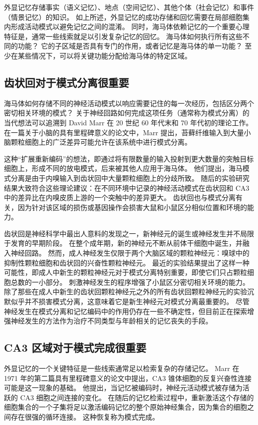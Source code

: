 外显记忆存储事实（语义记忆）、地点（空间记忆）、其他个体（社会记忆）和事件（情景记忆）的知识。 如上所述，外显记忆的成功存储和回忆需要在局部细胞集内形成活动模式以避免记忆之间的混淆。 同时，海马体依赖记忆的一个重要心理特征是，通常一些线索就足以引发复杂记忆的回忆。 海马体如何执行所有这些不同的功能？ 它的子区域是否具有专门的作用，或者记忆是海马体的单一功能？ 至少在某些情况下，可以将关键功能分配给海马体的特定区域。



\subsection{齿状回对于模式分离很重要}
海马体如何存储不同的神经活动模式以响应需要记住的每一次经历，包括区分两个密切相关环境的模式？ 关于神经回路如何完成这项任务（通常称为模式分离）的当代想法可以追溯到 David Marr 在 20 世纪 60 年代末和 70 年代初的理论工作。 在一篇关于小脑的具有里程碑意义的论文中，Marr 提出，苔藓纤维输入到大量小脑颗粒细胞上的广泛差异可能允许在该系统中进行模式分离。

这种“扩展重新编码”的想法，即通过将有限数量的输入投射到更大数量的突触目标细胞上，形成不同的放电模式，后来被其他人应用于海马体。 他们提出，海马模式分离是由于内嗅输入到齿状回中大量颗粒细胞上的分歧所致。 随后的实验研究结果大致符合这些理论建议：在不同环境中记录的神经活动模式在齿状回和 CA3 中的差异比在内嗅皮质上游的一个突触中的差异更大。 齿状回也与模式分离有关，因为针对该区域的损伤或基因操作会损害大鼠和小鼠区分相似位置和环境的能力。

齿状回是神经科学中最出人意料的发现之一，新神经元的诞生或神经发生并不局限于发育的早期阶段。 在整个成年期，新的神经元不断从前体干细胞中诞生，并融入神经回路。 然而，成人神经发生仅限于两个大脑区域的颗粒神经元：嗅球中的抑制性颗粒细胞和齿状回的兴奋性颗粒神经元。 最近的实验结果提出了这样一种可能性，即成人中新生的颗粒神经元对于模式分离特别重要，即使它们只占颗粒细胞总数的一小部分。 刺激神经发生的程序增强了小鼠区分密切相关环境的能力。 除了那些在成人中新生的齿状回颗粒神经元之外的所有齿状回颗粒神经元的实验沉默似乎并不损害模式分离，这意味着它是新生神经元对模式分离最重要的。 尽管神经发生在模式分离和记忆编码中的作用仍存在一些不确定性，但目前正在探索增强神经发生的方法作为治疗不同类型与年龄相关的记忆丧失的手段。

\subsection{CA3 区域对于模式完成很重要}
外显记忆的一个关键特征是一些线索通常足以检索复杂的存储记忆。 Marr 在 1971 年的第二篇具有里程碑意义的论文中提出，CA3 锥体细胞的反复兴奋性连接可能是这一现象的基础。 他提出，当记忆被编码时，神经元活动模式被存储为活跃的 CA3 细胞之间连接的变化。 在随后的记忆检索过程中，重新激活这个存储的细胞集合的一个子集将足以激活编码记忆的整个原始神经集合，因为集合的细胞之间存在很强的循环连接。 这种恢复称为模式完成。

